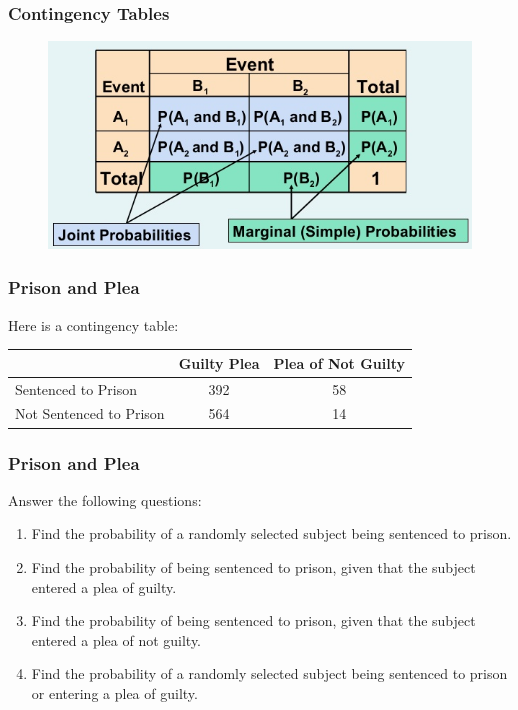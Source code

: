 \documentclass[xcolor=dvipsnames]{beamer}
\begin{document}
\begin{frame}
  \frametitle{Contingency Tables}
\begin{figure}[h]
\includegraphics[scale=.5]{./diagrams/contingency1.png}
\end{figure}
\end{frame}

\begin{frame}
  \frametitle{Prison and Plea}
Here is a contingency table:
\begin{tabular}{|l|c|c|}\hline
  & Guilty Plea & Plea of Not Guilty \\ \hline
  Sentenced to Prison & 392 & 58 \\ \hline
  Not Sentenced to Prison & 564 & 14 \\ \hline
\end{tabular}
\end{frame}

\begin{frame}
  \frametitle{Prison and Plea}
Answer the following questions:
\begin{enumerate}
\item Find the probability of a randomly selected subject being
  sentenced to prison.
\item Find the probability of being sentenced to prison, given
  that the subject entered a plea of guilty.
\item Find the probability of being sentenced to prison, given
  that the subject entered a plea of not guilty.
\item Find the probability of a randomly selected subject being
  sentenced to prison or entering a plea of guilty.
\end{enumerate}
\end{frame}
\end{document}
